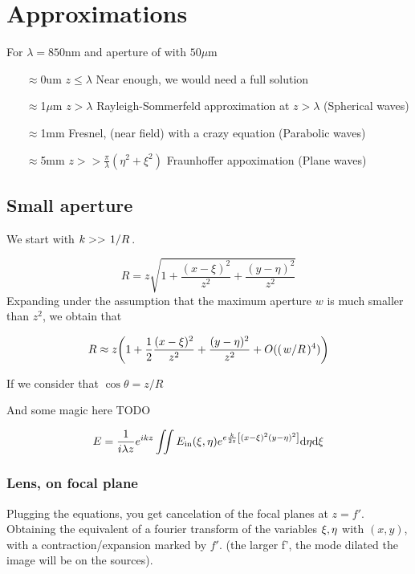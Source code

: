 \documentclass[../main/main.tex]{subfiles}
\begin{document}
\section{Approximations}
For $\lambda = 850 \textrm{nm}$ and aperture of with $50 \mu\textrm{m}$
\begin{itemize}
	\item[$\approx$0um] $z \leq \lambda$ Near enough, we would need a full solution
	\item[$\approx$1$\mu$m] $z > \lambda$ Rayleigh-Sommerfeld approximation at $z > \lambda$ (Spherical waves)
	\item[$\approx$1mm] Fresnel, (near field) with a crazy equation (Parabolic waves)
	\item[$\approx$5mm] $z>> \frac{\pi}{\lambda} (\eta^{2} + \xi^{2})$ Fraunhoffer appoximation (Plane waves)

\end{itemize}

\subsection{Small aperture}


We start with $k >> \flatfrac 1 R$.

\begin{equation}
R = z \sqrt{1 + \frac{(x-\xi)^{2}}{z^{2}}+\frac{(y-\eta)^{2}}{z^{2}}}
\end{equation}
Expanding under the assumption that the maximum aperture $w$ is much smaller than $z^{2}$,
we obtain that

\begin{equation}
R \approx z \qty(1 + \frac 1 2 \frac{(x-\xi)^{2}}{z^{2}}+\frac{(y-\eta)^{2}}{z^{2}} + O((\flatfrac w R)^{4}) )
\end{equation}

If we consider that $\cos \theta = z/R$

And some magic here TODO

\begin{equation}
E = \frac{1}{i \lambda z} e^{ikz} \iint E_{\textrm{in}}(\xi, \eta) e^{e \frac k {2z} \qty[(x-\xi)^{2}(y-\eta)^{2}]} \dd \eta \dd \xi
\end{equation}


\subsubsection{Lens, on focal plane}

Plugging the equations, you get cancelation of the focal planes at $z = f'$. Obtaining the equivalent of a fourier transform of the variables $\xi, \eta$ with $(x,y)$, with a contraction/expansion marked by $f'$. (the larger f', the mode dilated the image will be on the sources).
\end{document}
